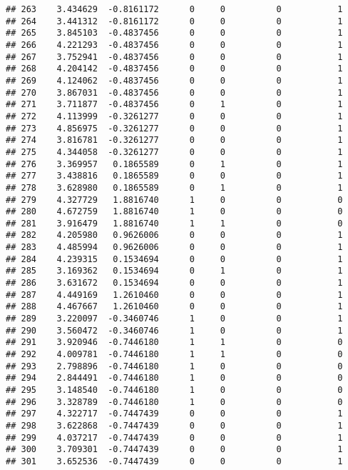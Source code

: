 \documentclass[
]{article}
\begin{document}
\begin{verbatim}
## 263    3.434629  -0.8161172      0     0          0           1
## 264    3.441312  -0.8161172      0     0          0           1
## 265    3.845103  -0.4837456      0     0          0           1
## 266    4.221293  -0.4837456      0     0          0           1
## 267    3.752941  -0.4837456      0     0          0           1
## 268    4.204142  -0.4837456      0     0          0           1
## 269    4.124062  -0.4837456      0     0          0           1
## 270    3.867031  -0.4837456      0     0          0           1
## 271    3.711877  -0.4837456      0     1          0           1
## 272    4.113999  -0.3261277      0     0          0           1
## 273    4.856975  -0.3261277      0     0          0           1
## 274    3.816781  -0.3261277      0     0          0           1
## 275    4.344058  -0.3261277      0     0          0           1
## 276    3.369957   0.1865589      0     1          0           1
## 277    3.438816   0.1865589      0     0          0           1
## 278    3.628980   0.1865589      0     1          0           1
## 279    4.327729   1.8816740      1     0          0           0
## 280    4.672759   1.8816740      1     0          0           0
## 281    3.916479   1.8816740      1     1          0           0
## 282    4.205980   0.9626006      0     0          0           1
## 283    4.485994   0.9626006      0     0          0           1
## 284    4.239315   0.1534694      0     0          0           1
## 285    3.169362   0.1534694      0     1          0           1
## 286    3.631672   0.1534694      0     0          0           1
## 287    4.449169   1.2610460      0     0          0           1
## 288    4.467667   1.2610460      0     0          0           1
## 289    3.220097  -0.3460746      1     0          0           1
## 290    3.560472  -0.3460746      1     0          0           1
## 291    3.920946  -0.7446180      1     1          0           0
## 292    4.009781  -0.7446180      1     1          0           0
## 293    2.798896  -0.7446180      1     0          0           0
## 294    2.844491  -0.7446180      1     0          0           0
## 295    3.148540  -0.7446180      1     0          0           0
## 296    3.328789  -0.7446180      1     0          0           0
## 297    4.322717  -0.7447439      0     0          0           1
## 298    3.622868  -0.7447439      0     0          0           1
## 299    4.037217  -0.7447439      0     0          0           1
## 300    3.709301  -0.7447439      0     0          0           1
## 301    3.652536  -0.7447439      0     0          0           1

\end{verbatim}
\end{document}
